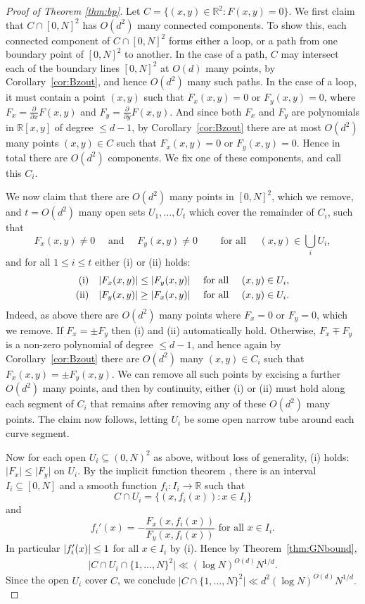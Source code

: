 \documentclass[12pt]{amsart}
\newcommand{\R}{{\mathbb R}}
\newcommand{\1}{{\mathbf 1}}
\theoremstyle{remark}
\theoremstyle{definition}
\begin{document}
\begin{proof}[Proof of Theorem \ref{thm:bp}]
Let $C=\{(x,y)\in\R^2:F(x,y)=0\}$.  We first claim that $C\cap [0,N]^2$ has $O(d^2)$ many connected components. To show this, each connected component of $C\cap [0,N]^2$ forms either a loop, or a path from one boundary point of $[0,N]^2$ to another. 
In the case of a path, $C$ may intersect each of the boundary lines $[0,N]^2$ at $O(d)$ many points, by Corollary~\ref{cor:Bzout}, and hence $O(d^2)$ many such paths.
In the case of a loop, it must contain a point $(x,y)$ such that $F_x(x,y)=0$ or $F_y(x,y)=0$, where $F_x=\frac{\partial}{\partial x}F(x,y)$ and $F_y=\frac{\partial}{\partial y}F(x,y)$. And since both $F_x$ and $F_y$ are polynomials in $\mathbb{R}[x,y]$ of degree $\leq d-1$, by Corollary~\ref{cor:Bzout} there are at most $O(d^2)$ many points $(x,y)\in C$ such that $F_x(x,y)=0$ or $F_y(x,y)=0$. 
Hence in total there are $O(d^2)$ components. We fix one of these components, and call this $C_i$.

We now claim that there are $O(d^2)$ many points in $[0,N]^2$, which we remove, and $t=O(d^2)$ many open sets $U_1,\ldots,U_t$ which cover the remainder of $C_i$, such that
\[F_x(x,y)\neq 0\quad\textrm{ and }\quad F_y(x,y)\neq 0\qquad\textrm{ for all }\quad(x,y)\in \bigcup_i U_i,\]
and for all $1\leq i \leq t$ either (i) or (ii) holds:
\begin{align*}
{\rm (i)} & &\lvert F_x(x,y)\rvert \le \lvert F_y(x,y)\rvert\quad\textrm{ for all }\quad(x,y)\in U_i,\\
{\rm (ii)} & &\lvert F_y(x,y)\rvert \ge \lvert F_x(x,y)\rvert\quad\textrm{ for all }\quad(x,y)\in U_i.
\end{align*}
Indeed, as above there are $O(d^2)$ many points where $F_x=0$ or $F_y=0$, which we remove. If $F_x=\pm F_y$ then (i) and (ii) automatically hold. Otherwise, $F_x\mp F_y$ is a non-zero polynomial of degree $\leq d-1$, and hence again by Corollary~\ref{cor:Bzout} there are $O(d^2)$ many $(x,y)\in C_i$ such that $F_x(x,y)=\pm F_y(x,y)$. We can remove all such points by excising a further $O(d^2)$ many points, and then by continuity, either (i) or (ii) must hold along each segment of $C_i$ that remains after removing any of these $O(d^2)$ many points. The claim now follows, letting $U_i$ be some open narrow tube around each curve segment.

Now for each open $U_i\subseteq (0,N)^2$ as above, without loss of generality, (i) holds: $\lvert F_x\rvert\leq \lvert F_y\rvert$ on $U_i$. By the implicit function theorem \cite[Theorem 3.16]{Kn05}, there is an interval $I_i\subseteq [0,N]$ and a smooth function $f_i:I_i\to \mathbb{R}$ such that
\[C\cap U_i=\{(x,f_{i}(x)) : x\in I_i\}\]
and
\[f_{i}'(x) = -\frac{F_x(x,f_{i}(x))}{F_y(x,f_{i}(x))}\textrm{ for all }x\in I_i.\]
In particular $\abs{f_{i}'(x)}\leq 1$ for all $x\in I_i$ by (i). Hence by Theorem~\ref{thm:GNbound},
\begin{align}\label{eq:CUibound}
\lvert C\cap U_i\cap \{1,\ldots,N\}^2\rvert \ll (\log N)^{O(d)}N^{1/d}.
\end{align}
Since the open $U_i$ cover $C$, we conclude $\lvert C\cap \{1,\ldots, N\}^2\rvert \ll d^2 (\log N)^{O(d)}N^{1/d}.$
\end{proof}
\end{document}

